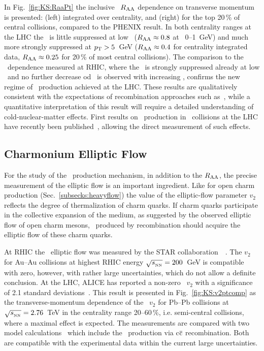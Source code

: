 In Fig.~\ref{fig:KS:RaaPt} the inclusive \Jpsi\ $R_{\rm AA}$ dependence on transverse momentum is presented: (left) integrated over centrality, and (right) for the top 20\,\% of central collisions, compared to the PHENIX result. In both centrality ranges at the LHC the \Jpsi\ is little suppressed at low \pt\ ($R_\mathrm{AA} \approx 0.8$ at \pt\ 0--1~GeV) and much more strongly suppressed at $\mbox{$p_{\mathrm{T}}$} > 5$~GeV ($R_\mathrm{AA} \approx 0.4$ for centrality integrated data, $R_\mathrm{AA} \approx 0.25$ for 20\,\% of most central collisions). The comparison to the \pt\ dependence measured at RHIC, where the \Jpsi\ is strongly suppressed already at low \pt\ and no further decrease od \Raa\ is observed with increasing \pt, confirms the new regime of \Jpsi\ production achieved at the LHC. These results are qualitatively consistent
with the expectations of recombination approaches such as~\cite{Zhao:2007hh,Zhou:2013aea,Liu:2009nb}, while a quantitative interpretation of this result will require
a detailed understanding of cold-nuclear-matter effects. First results on \Jpsi\ production in \pPb\ collisions at the LHC have recently been published~\cite{Abelev:2013yxa,Aaij:2013zxa}, allowing the direct measurement of such effects.

\subsection{Charmonium Elliptic Flow}

For the study of the \Jpsi\ production mechanism, in addition to the $R_{\rm AA}$, the precise measurement of the elliptic flow is an important ingredient. Like for open charm production (Sec.~\ref{subsecks:heavyflow}) the value of the elliptic-flow parameter $v_2$ reflects the degree of thermalization of charm quarks. If charm quarks participate in the collective expansion of the medium, as suggested by the observed elliptic flow of open charm mesons, \jpsi\ produced by recombination should acquire the elliptic flow of these charm quarks.

At RHIC the \Jpsi\ elliptic flow was measured by the STAR collaboration~~\cite{Adamczyk:2012pw}. The $v_2$ for Au--Au collisions at highest RHIC energy $\sqrt{s_{_{\rm NN}}} = 200$~GeV is compatible with zero, however, with rather large uncertainties, which do not allow a definite conclusion. At the LHC, ALICE has reported a non-zero \Jpsi\ $v_2$ with a significance of 2.1 standard deviations~\cite{ALICE:2013xna}. This result is presented in Fig.~\ref{fig:KS:v2ptcomp} as the transverse-momentum dependence of the \Jpsi\ $v_2$ for Pb--Pb collisions at $\sqrt{s_{_{\rm NN}}} = 2.76$~TeV in the centrality range 20--60\,\%, i.e. semi-central collisions, where a maximal effect is expected. The measurements are compared with two model calculations~\cite{Liu:2009gx,Zhao:2012gc} which include the \Jpsi\ production via c$\overline{\rm c}$ recombination. Both are compatible with the experimental data within the current large uncertainties.

